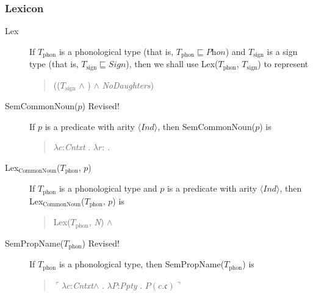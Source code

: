 \subsubsection{Lexicon}
\begin{description}
\item[\textnormal{Lex}] \mbox{}

  If $T_{\mathrm{phon}}$ is a phonological type (that is,
$T_{\mathrm{phon}}\sqsubseteq\textit{Phon}$) and $T_{\mathrm{sign}}$
is a sign type (that is, $T_{\mathrm{sign}}\sqsubseteq\textit{Sign}$), then we shall use
Lex($T_{\mathrm{phon}}$, $T_{\mathrm{sign}}$) to represent
\begin{quote}
(($T_{\mathrm{sign}}$ \d{$\wedge$}
)
\d{$\wedge$} \textit{NoDaughters})
\end{quote}

\item[\textnormal{SemCommonNoun($p$)} Revised!] \mbox{}

  If $p$ is a predicate with arity $\langle\textit{Ind}\rangle$, then SemCommonNoun($p$) is
  \begin{quote}
    $\lambda c$:\textit{Cntxt} . $\lambda
r$:
. 
\end{quote}

\item[\textnormal{Lex$_{\mathrm{CommonNoun}}$($T_{\mathrm{phon}}$,
    $p$)}] \mbox{}

  If $T_{\mathrm{phon}}$ is a phonological type and $p$ is a
  predicate with arity $\langle\textit{Ind}\rangle$, then Lex$_{\mathrm{CommonNoun}}$($T_{\mathrm{phon}}$,
  $p$) is
  \begin{quote}
    Lex($T_{\mathrm{phon}}$, \textit{N}) \d{$\wedge$}
  \end{quote}
  
\item[\textnormal{SemPropName($T_{\text{phon}}$)} Revised!] \mbox{}

  If $T_{\text{phon}}$ is a phonological type, then SemPropName($T_{\text{phon}}$) is
  \begin{quote}
    $\ulcorner\lambda c$:\textit{Cntxt}\d{$\wedge$} . $\lambda
                       P$:\textit{Ppty} . $P(c.\mathfrak{c})\urcorner$
  \end{quote}
  

\end{description}
